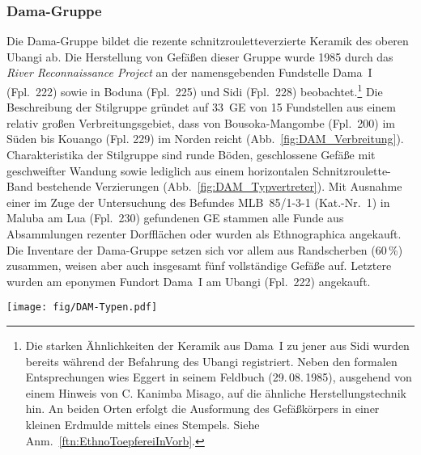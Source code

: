 \subsubsection{Dama-Gruppe}\label{sec:DAM-Gr}

Die Dama-Gruppe bildet die rezente schnitzrouletteverzierte Keramik des oberen \mbox{Ubangi} ab. Die Herstellung von Gefäßen dieser Gruppe wurde 1985 durch das \textit{River Reconnaissance Project} an der namensgebenden Fundstelle Dama~I (Fpl.~222) sowie in Boduna (Fpl.~225) und Sidi (Fpl.~228) beobachtet.\footnote{Die starken Ähnlichkeiten der Keramik aus Dama~I zu jener aus Sidi wurden bereits während der Befahrung des \mbox{Ubangi} registriert. Neben den formalen Entsprechungen wies Eggert in seinem Feldbuch (29.\,08.\,1985), ausgehend von einem Hinweis von C. Kanimba Misago, auf die ähnliche Herstellungstechnik hin. An beiden Orten erfolgt die Ausformung des Gefäßkörpers in einer kleinen Erdmulde mittels eines Stempels. Siehe Anm.~\ref{ftn:EthnoToepfereiInVorb}.} Die Beschreibung der Stilgruppe gründet auf 33~GE von 15 Fundstellen aus einem relativ großen Verbreitungsgebiet, dass von Bousoka-Mangombe (Fpl.~200) im Süden bis Kouango (Fpl. 229) im Norden reicht (Abb.~\ref{fig:DAM_Verbreitung}). Charakteristika der Stilgruppe sind runde Böden, geschlossene Gefäße mit geschweifter Wandung sowie lediglich aus einem horizontalen Schnitzroulette-Band bestehende Verzierungen (Abb.~\ref{fig:DAM_Typvertreter}). Mit Ausnahme einer im Zuge der Untersuchung des Befundes MLB~85/1-3-1 (Kat.-Nr.~1) in Maluba am Lua (Fpl.~230) gefundenen GE stammen alle Funde aus Absammlungen rezenter Dorfflächen oder wurden als Ethnographica angekauft. Die Inventare der Dama-Gruppe setzen sich vor allem aus Randscherben (60\,\%) zusammen, weisen aber auch insgesamt fünf vollständige Gefäße auf. Letztere wurden am eponymen Fundort Dama~I am \mbox{Ubangi} (Fpl.~222) angekauft.

\begin{figure*}[tb]
	\centering
	\texttt{[image: fig/DAM-Typen.pdf]}
	\caption{Dama-Gruppe: Typvertreter.\\1:~Taf.~22.3; 2:~Taf.~24.1; 3:~Taf.~22.2; 4:~Taf.~12.16; 5:~Taf.~23.8; 6:~Taf.~22.4; 7:~Taf.~23.6; 8:~Taf.~23.5.}
	\label{fig:DAM_Typvertreter}
\end{figure*}

